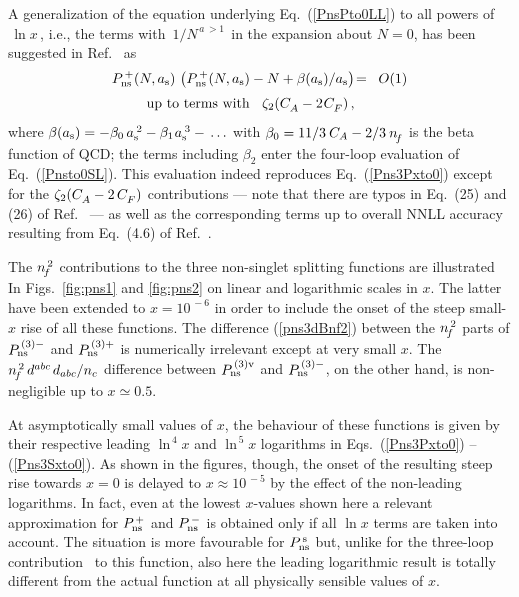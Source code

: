 \documentclass[12pt]{article}
\newcommand{\bea}{\begin{eqnarray}}
\newcommand{\eea}{\end{eqnarray}}
\newcommand{\nn}{\nonumber}
\newcommand{\ars}{a_{\rm s}}
\begin{document}
A generalization of the equation underlying Eq.~(\ref{PnsPto0LL}) to all powers
of $\,\ln x\,$, i.e., the terms with $\,1/N^{\,a \,>1\,}$ in the expansion about 
$N=0$, has been suggested in Ref.~\cite{VelizDL} as
%
\bea
\label{Pnsto0SL}
  P_{\rm ns}^{\,+}(N,\ars) \,\left( P_{\rm ns}^{\,+}(N,\ars) 
  - N + \beta(\ars) / \ars \right) &\!=\!& O(1) 
\nn \\[1mm]
  \mbox{ up to terms with $\;\;\z2 (\ca -2\:\! \cf )\,$,} & & 
\eea
%
where $\beta(\ars) = - \beta_0 \,\ar(2) - \beta_1 \:\!\ar(3) - \,\ldots$ with 
$\beta_0 = 11/3\: C_A - 2/3\: {n^{}_{\! f}}$ is the beta function of QCD; the terms 
including $\beta_2$ \cite{beta2a,beta2b} enter the four-loop evaluation of 
Eq.~(\ref{Pnsto0SL}). This evaluation indeed reproduces Eq.~(\ref{Pns3Pxto0}) 
except for the ${\zeta_{2}} ({C^{}_A} -2\,{C^{}_F})$ contributions --- note that there are typos
in Eq.~(25) and (26) of Ref.~\cite{VelizDL} --- as well as the corresponding
terms up to overall NNLL accuracy resulting from Eq.~(4.6) of 
Ref.~\cite{avLL2012}.

The ${n^{\,2}_{\! f}}$ contributions to the three non-singlet splitting functions are 
illustrated In Figs.~\ref{fig:pns1} and \ref{fig:pns2} on linear and 
logarithmic scales in $x$. The latter have been extended to $x = 10^{\,-6}$ in 
order to include the onset of the steep small-$x$ rise of all these functions.
The difference (\ref{pns3dBnf2}) between the ${n^{\,2}_{\! f}}$ parts of 
$P_{\rm ns}^{\,(3)-}$ and $P_{\rm ns}^{\,(3)+}$ is numerically irrelevant 
except at very small $x$. 
The ${n^{\,2}_{\! f}}\, d^{abc\,}d_{abc}/n_c$ difference between $P_{\rm ns}^{\,(3)\rm v}$
and $P_{\rm ns}^{\,(3)-}$, on the other hand, is non-negligible up to 
$x \simeq 0.5$.

At asymptotically small values of $x$, the behaviour of these functions 
is given by their respective leading $\ln^{\,4}x$ and $\ln^{\,5}x$ logarithms 
in Eqs.~(\ref{Pns3Pxto0}) -- (\ref{Pns3Sxto0}). As shown in the figures, 
though, the onset of the resulting steep rise towards $x = 0$ is delayed to 
$x \approx 10^{\,-5}$ by the effect of the non-leading logarithms. In fact,
even at the lowest $x$-values shown here a relevant approximation for
$P_{\rm ns}^{\,+}$ and $P_{\rm ns}^{\,-}$ is obtained only if all $\ln x$ 
terms are taken into account. 
The situation is more favourable for $P_{\rm ns}^{\,\rm s}$ but, unlike for 
the three-loop contribution~\cite{mvvPns} to this function, also here the 
leading logarithmic result is totally different from the actual function at
all physically sensible values of $x$.
\end{document}
